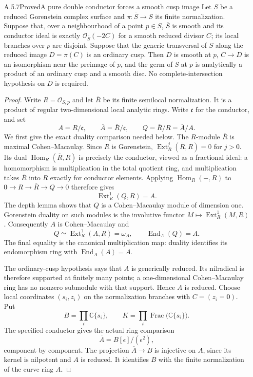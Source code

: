 \begin{statement}{A.5.7}{Proved}{A pure double conductor forces a smooth cusp image}
Let $S$ be a reduced Gorenstein complex surface and
$\pi:\overline S\to S$ its finite normalization.
Suppose that, over a neighbourhood of a point $p\in S$,
$\overline S$ is smooth and its conductor ideal is exactly
$\mathcal O_{\overline S}(-2C)$ for a smooth reduced
divisor $C$; its local branches over $p$ are disjoint.
Suppose that the generic transversal of $S$ along the
reduced image $D=\pi(C)$ is an ordinary cusp.
Then $D$ is smooth at $p$, $C\to D$ is an isomorphism
near the preimage of $p$, and the germ of $S$ at $p$ is
analytically a product of an ordinary cusp and a smooth disc.
No complete-intersection hypothesis on $D$ is required.
\end{statement}
\begin{proof}
Write $R=\mathcal O_{S,p}$ and let $\overline R$ be its
finite semilocal normalization. It is a product of regular
two-dimensional local analytic rings. Write $\mathfrak c$
for the conductor, and set
\[
 A=R/\mathfrak c,\qquad
 \overline A=\overline R/\mathfrak c,\qquad
 Q=\overline R/R=\overline A/A.
\]
We first give the exact duality comparison needed below.
The $R$-module $\overline R$ is maximal Cohen--Macaulay.
Since $R$ is Gorenstein,
$\operatorname{Ext}_R^j(\overline R,R)=0$ for $j>0$.
Its dual $\operatorname{Hom}_R(\overline R,R)$ is
precisely the conductor, viewed as a fractional ideal:
a homomorphism is multiplication in the total quotient ring,
and multiplication takes $\overline R$ into $R$ exactly
for conductor elements. Applying $\operatorname{Hom}_R(-,R)$
to $0\to R\to\overline R\to Q\to0$ therefore gives
\[
 \operatorname{Ext}_R^1(Q,R)=A.                    \tag{A.J.11}
\]
The depth lemma shows that $Q$ is a Cohen--Macaulay module
of dimension one. Gorenstein duality on such modules is the
involutive functor $M\mapsto\operatorname{Ext}_R^1(M,R)$.
Consequently $A$ is Cohen--Macaulay and
\[
 Q\simeq\operatorname{Ext}_R^1(A,R)=\omega_A,
 \qquad \operatorname{End}_A(Q)=A.                \tag{A.J.12}
\]
The final equality is the canonical multiplication map:
duality identifies its endomorphism ring with
$\operatorname{End}_A(A)=A$.

The ordinary-cusp hypothesis says that $A$ is generically
reduced. Its nilradical is therefore supported at finitely
many points; a one-dimensional Cohen--Macaulay ring has
no nonzero submodule with that support. Hence $A$ is reduced.
Choose local coordinates $(s_i,z_i)$ on the normalization
branches with $C=(z_i=0)$. Put
\[
 B=\prod_i\mathbb C\{s_i\},\qquad
 K=\prod_i\operatorname{Frac}\bigl(\mathbb C\{s_i\}\bigr).
\]
The specified conductor gives the actual ring comparison
\[
 \overline A=B[\epsilon]/(\epsilon^2),             \tag{A.J.13}
\]
component by component. The projection
$\overline A\to B$ is injective on $A$, since its kernel
is nilpotent and $A$ is reduced. It identifies $B$ with
the finite normalization of the curve ring $A$.


\end{proof}
